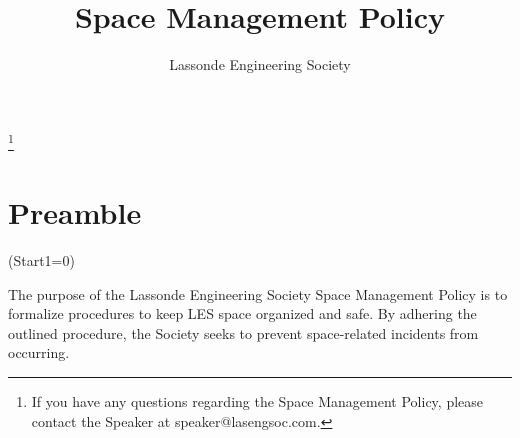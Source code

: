 \documentclass[10pt]{article}
\title{Space Management Policy}
\author{Lassonde Engineering Society}
\date{}
\begin{document}
\pagebreak

\tableofcontents\let\thefootnote\relax\footnote{{If you have any questions regarding the Space Management Policy, please contact the Speaker at speaker@lasengsoc.com.}}
\clearpage

\setcounter{page}{1}

\section{Preamble}
\vspace{5mm} %
\ListProperties(Start1=0)
\begin{easylist}
The purpose of the Lassonde Engineering Society Space Management Policy is to formalize procedures to keep LES space organized and safe. By adhering the outlined procedure, the Society seeks to prevent space-related incidents from occurring.
\end{easylist}
\end{document}
